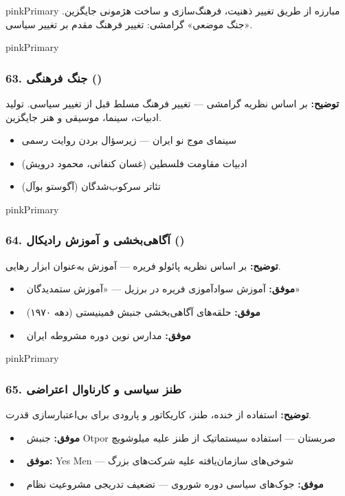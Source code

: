 \documentclass[a4paper,12pt]{article}
\newcommand{\success}[1]{\textcolor{greenPrimary}{\faCheckCircle\ \textbf{موفق:}} #1}
\newcommand{\methodnum}[1]{\textcolor{purpleLight}{\textbf{#1.}}}
\begin{document}
\begin{sectionbox}{pinkPrimary}
مبارزه از طریق تغییر ذهنیت، فرهنگ‌سازی و ساخت هژمونی جایگزین. «جنگ موضعی» گرامشی: تغییر فرهنگ مقدم بر تغییر سیاسی.
\end{sectionbox}

\begin{methodcard}{pinkPrimary}
\subsubsection{\methodnum{63} جنگ فرهنگی ()}
\textbf{توضیح:} بر اساس نظریه گرامشی — تغییر فرهنگ مسلط قبل از تغییر سیاسی. تولید ادبیات، سینما، موسیقی و هنر جایگزین.

\begin{itemize}
  \item سینمای موج نو ایران — زیرسؤال بردن روایت رسمی
  \item ادبیات مقاومت فلسطین (غسان کنفانی، محمود درویش)
  \item تئاتر سرکوب‌شدگان (آگوستو بوآل)
\end{itemize}
\end{methodcard}

\begin{methodcard}{pinkPrimary}
\subsubsection{\methodnum{64} آگاهی‌بخشی و آموزش رادیکال ()}
\textbf{توضیح:} بر اساس نظریه پائولو فریره — آموزش به‌عنوان ابزار رهایی.

\begin{itemize}[label=\textcolor{greenPrimary}{\faCheckCircle}]
  \item \success{آموزش سوادآموزی فریره در برزیل — «آموزش ستمدیدگان»}
  \item \success{حلقه‌های آگاهی‌بخشی جنبش فمینیستی (دهه ۱۹۷۰)}
  \item \success{مدارس نوین دوره مشروطه ایران}
\end{itemize}
\end{methodcard}

\begin{methodcard}{pinkPrimary}
\subsubsection{\methodnum{65} طنز سیاسی و کارناوال اعتراضی}
\textbf{توضیح:} استفاده از خنده، طنز، کاریکاتور و پارودی برای بی‌اعتبارسازی قدرت.

\begin{itemize}[label=\textcolor{greenPrimary}{\faCheckCircle}]
  \item \success{جنبش Otpor صربستان — استفاده سیستماتیک از طنز علیه میلوشویچ}
  \item \success{Yes Men — شوخی‌های سازمان‌یافته علیه شرکت‌های بزرگ}
  \item \success{جوک‌های سیاسی دوره شوروی — تضعیف تدریجی مشروعیت نظام}
\end{itemize}
\end{methodcard}
\end{document}
